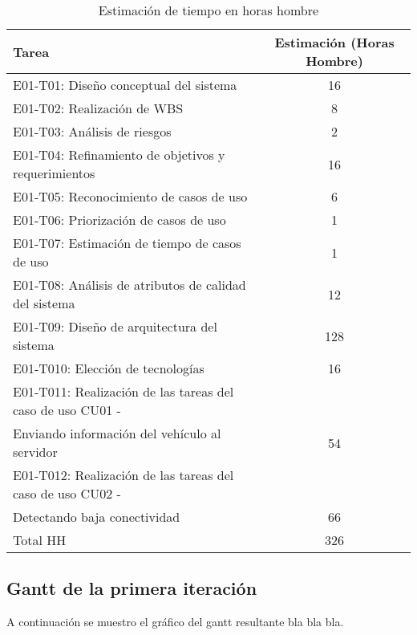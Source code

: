 \begin{table}[htb]
\begin{center}
\begin{tabular}{|l|c|}
\hline
Tarea & Estimación (Horas Hombre) \\
\hline \hline
E01-T01: Diseño conceptual del sistema & 16 \\ \hline
E01-T02: Realización de WBS & 8 \\ \hline
E01-T03: Análisis de riesgos & 2 \\ \hline
E01-T04: Refinamiento de objetivos y requerimientos & 16 \\ \hline
E01-T05: Reconocimiento de casos de uso & 6 \\ \hline
E01-T06: Priorización de casos de uso & 1 \\ \hline
E01-T07: Estimación de tiempo de casos de uso & 1 \\ \hline
E01-T08: Análisis de atributos de calidad del sistema & 12 \\ \hline
E01-T09: Diseño de arquitectura del sistema & 128 \\ \hline
E01-T010: Elección de tecnologías & 16 \\ \hline
E01-T011: Realización de las tareas del caso de uso CU01 - \\ Enviando información del vehículo al servidor & 54 \\ \hline
E01-T012: Realización de las tareas del caso de uso CU02 - \\ Detectando baja conectividad & 66 \\ \hline
Total HH & 326 \\ \hline
\end{tabular}
\caption{Estimación de tiempo en horas hombre}
\label{tabla:sencilla}
\end{center}
\end{table}


\subsection{Gantt de la primera iteración}

A continuación se muestro el gráfico del gantt resultante bla bla bla.

